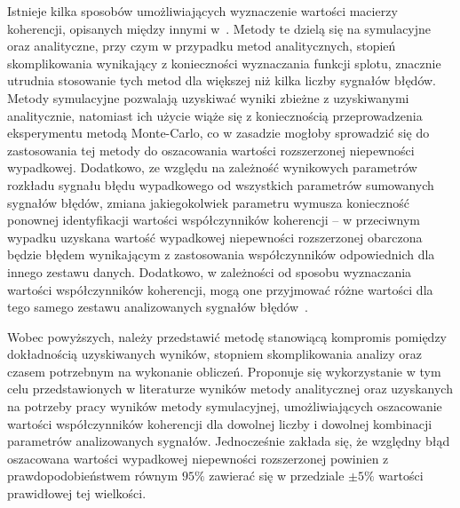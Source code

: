 Istnieje kilka sposobów umożliwiających wyznaczenie wartości macierzy koherencji, opisanych między innymi w~\cite{jakubiec_redmono, jakubiec_reductive, jakubiec_system, batko_uncertainty}. Metody te dzielą się na symulacyjne oraz analityczne, przy czym w przypadku metod analitycznych, stopień skomplikowania wynikający z konieczności wyznaczania funkcji splotu, znacznie utrudnia stosowanie tych metod dla większej niż kilka liczby sygnałów błędów. Metody symulacyjne pozwalają uzyskiwać wyniki zbieżne z uzyskiwanymi analitycznie, natomiast ich użycie wiąże się z koniecznością przeprowadzenia eksperymentu metodą Monte-Carlo, co w zasadzie mogłoby sprowadzić się do zastosowania tej metody do oszacowania wartości rozszerzonej niepewności wypadkowej. Dodatkowo, ze względu na zależność wynikowych parametrów rozkładu sygnału błędu wypadkowego od wszystkich parametrów sumowanych sygnałów błędów, zmiana jakiegokolwiek parametru wymusza konieczność ponownej identyfikacji wartości współczynników koherencji -- w przeciwnym wypadku uzyskana wartość wypadkowej niepewności rozszerzonej obarczona będzie błędem wynikającym z zastosowania współczynników odpowiednich dla innego zestawu danych. Dodatkowo, w zależności od sposobu wyznaczania wartości współczynników koherencji, mogą one przyjmować różne wartości dla tego samego zestawu analizowanych sygnałów błędów~\cite{jakubiec_redmono}.

Wobec powyższych, należy przedstawić metodę stanowiącą kompromis pomiędzy dokładnością uzyskiwanych wyników, stopniem skomplikowania analizy oraz czasem potrzebnym na wykonanie obliczeń. Proponuje się wykorzystanie w tym celu przedstawionych w literaturze wyników metody analitycznej oraz uzyskanych na potrzeby pracy wyników metody symulacyjnej, umożliwiających oszacowanie wartości współczynników koherencji dla dowolnej liczby i dowolnej kombinacji parametrów analizowanych sygnałów. Jednocześnie zakłada się, że względny błąd oszacowana wartości wypadkowej niepewności rozszerzonej powinien z prawdopodobieństwem równym $95\%$ zawierać się w przedziale $\pm 5\%$ wartości prawidłowej tej wielkości.

